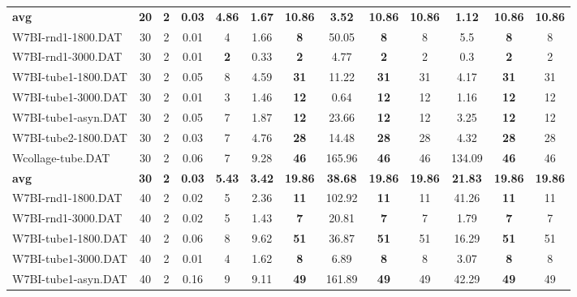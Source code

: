 \begin{table}[h]
{\begin{tabular}{lcccccccccccc}
\cline{1-13} \textbf{avg} & \textbf{20} & \textbf{2} & \textbf{0.03} & \textbf{4.86} & \textbf{1.67} & \textbf{10.86} & \textbf{3.52} & \textbf{10.86} & \textbf{10.86} & \textbf{1.12} & \textbf{10.86} & \textbf{10.86} \\ \cline{1-13}
W7BI-rnd1-1800.DAT & 30 & 2 &  \textcolor{blue2}{0.01} & 4 & 1.66 &  \textbf{8} & 50.05 &  \textbf{8} & 8 & 5.5 &  \textbf{8} & 8 \\
W7BI-rnd1-3000.DAT & 30 & 2 &  \textcolor{blue2}{0.01} &  \textbf{2} & 0.33 &  \textbf{2} & 4.77 &  \textbf{2} & 2 & 0.3 &  \textbf{2} & 2 \\
W7BI-tube1-1800.DAT & 30 & 2 &  \textcolor{blue2}{0.05} & 8 & 4.59 &  \textbf{31} & 11.22 &  \textbf{31} & 31 & 4.17 &  \textbf{31} & 31 \\
W7BI-tube1-3000.DAT & 30 & 2 &  \textcolor{blue2}{0.01} & 3 & 1.46 &  \textbf{12} & 0.64 &  \textbf{12} & 12 & 1.16 &  \textbf{12} & 12 \\
W7BI-tube1-asyn.DAT & 30 & 2 &  \textcolor{blue2}{0.05} & 7 & 1.87 &  \textbf{12} & 23.66 &  \textbf{12} & 12 & 3.25 &  \textbf{12} & 12 \\
W7BI-tube2-1800.DAT & 30 & 2 &  \textcolor{blue2}{0.03} & 7 & 4.76 &  \textbf{28} & 14.48 &  \textbf{28} & 28 & 4.32 &  \textbf{28} & 28 \\
Wcollage-tube.DAT & 30 & 2 &  \textcolor{blue2}{0.06} & 7 & 9.28 &  \textbf{46} & 165.96 &  \textbf{46} & 46 & 134.09 &  \textbf{46} & 46 \\
\cline{1-13} \textbf{avg} & \textbf{30} & \textbf{2} & \textbf{0.03} & \textbf{5.43} & \textbf{3.42} & \textbf{19.86} & \textbf{38.68} & \textbf{19.86} & \textbf{19.86} & \textbf{21.83} & \textbf{19.86} & \textbf{19.86} \\ \cline{1-13}
W7BI-rnd1-1800.DAT & 40 & 2 &  \textcolor{blue2}{0.02} & 5 & 2.36 &  \textbf{11} & 102.92 &  \textbf{11} & 11 & 41.26 &  \textbf{11} & 11 \\
W7BI-rnd1-3000.DAT & 40 & 2 &  \textcolor{blue2}{0.02} & 5 & 1.43 &  \textbf{7} & 20.81 &  \textbf{7} & 7 & 1.79 &  \textbf{7} & 7 \\
W7BI-tube1-1800.DAT & 40 & 2 &  \textcolor{blue2}{0.06} & 8 & 9.62 &  \textbf{51} & 36.87 &  \textbf{51} & 51 & 16.29 &  \textbf{51} & 51 \\
W7BI-tube1-3000.DAT & 40 & 2 &  \textcolor{blue2}{0.01} & 4 & 1.62 &  \textbf{8} & 6.89 &  \textbf{8} & 8 & 3.07 &  \textbf{8} & 8 \\
W7BI-tube1-asyn.DAT & 40 & 2 &  \textcolor{blue2}{0.16} & 9 & 9.11 &  \textbf{49} & 161.89 &  \textbf{49} & 49 & 42.29 &  \textbf{49} & 49 \\

\end{tabular}}
\end{table}
